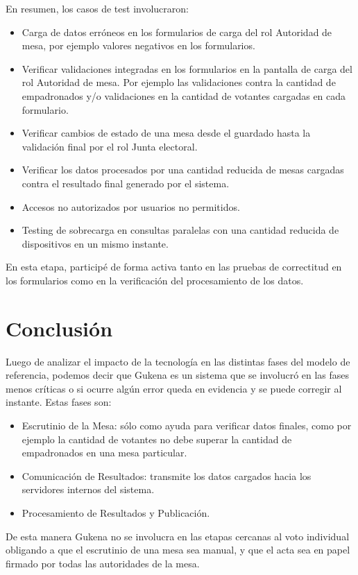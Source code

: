 En resumen, los casos de test involucraron:
\begin{itemize}
    \item Carga de datos erróneos en los formularios de carga del rol Autoridad de mesa, por ejemplo valores negativos en los formularios.
    \item Verificar validaciones integradas en los formularios en la pantalla de carga del rol Autoridad de mesa. Por ejemplo las validaciones contra la cantidad de empadronados y/o validaciones en la cantidad de votantes cargadas en cada formulario.
    \item Verificar cambios de estado de una mesa desde el guardado hasta la validación final por el rol Junta electoral.
    \item Verificar los datos procesados por una cantidad reducida de mesas cargadas contra el resultado final generado por el sistema.
    \item Accesos no autorizados por usuarios no permitidos.
    \item Testing de sobrecarga en consultas paralelas con una cantidad reducida de dispositivos en un mismo instante.
\end{itemize}

En esta etapa, participé de forma activa tanto en las pruebas de correctitud en los formularios como en la verificación del procesamiento de los datos.

\section{Conclusión}

Luego de analizar el impacto de la tecnología en las distintas fases del modelo de referencia, podemos decir que Gukena es un sistema que se involucró en las fases menos críticas o si ocurre algún error queda en evidencia y se puede corregir al instante. Estas fases son: 
\begin{itemize}
    \item Escrutinio de la Mesa: sólo como ayuda para verificar datos finales, como por ejemplo la cantidad de votantes no debe superar la cantidad de empadronados en una mesa particular.
    \item Comunicación de Resultados: transmite los datos cargados hacia los servidores internos del sistema.
    \item Procesamiento de Resultados y Publicación.
\end{itemize}

De esta manera Gukena no se involucra en las etapas cercanas al voto individual obligando a que el escrutinio de una mesa sea manual, y que el acta sea en papel firmado por todas las autoridades de la mesa.
 
